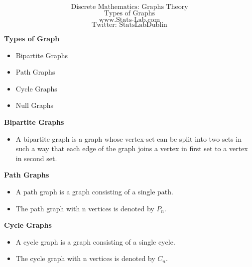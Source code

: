 \documentclass{beamer}
\begin{document}
\begin{frame}
\huge
\[ \mbox{Discrete Mathematics: Graphs Theory}\]
\[ \mbox{Types of Graphs}\]
\Large
\[ \mbox{www.Stats-Lab.com}\]
\[ \mbox{Twitter: StatsLabDublin}\]
\end{frame}

\begin{frame}
\Large
\textbf{Types of Graph}
\begin{itemize}
\item Bipartite Graphs
\item Path Graphs
\item Cycle Graphs
\item Null Graphs
\end{itemize}
\end{frame}
\begin{frame}
\Large
\vspace{-2cm}
\textbf{Bipartite Graphs}
\begin{itemize}
\item A bipartite graph is a graph whose vertex-set can be split into two sets in such a way that each edge of the graph joins a vertex in first set to a vertex in second set.
\end{itemize}

\end{frame}

\begin{frame}
\Large
\vspace{-2cm}
\textbf{Path Graphs}
\begin{itemize}
\item A path graph is a graph consisting of a single path. 
\item The path graph with n vertices is denoted by $P_n$.
\end{itemize}

\end{frame}
\begin{frame}
\Large
\vspace{-2cm}
\textbf{Cycle Graphs}
\begin{itemize}
\item A cycle graph is a graph consisting of a single cycle. 
\item The cycle graph with n vertices is denoted by $C_n$.
\end{itemize}

\end{frame}
\end{document}
